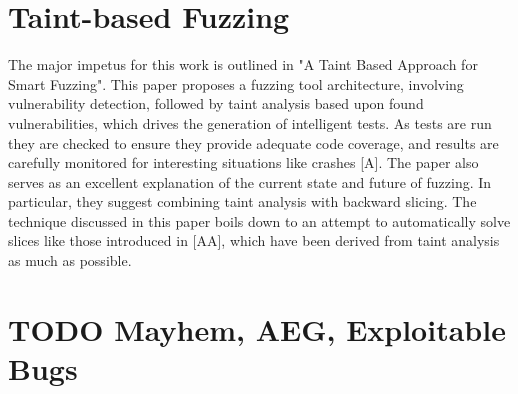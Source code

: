 \documentclass[11pt,expanded,copyright]{fsuthesis}
\begin{document}







\section{Taint-based Fuzzing}

The major impetus for this work is outlined in "A Taint Based Approach for Smart Fuzzing". This paper proposes a fuzzing tool architecture, involving vulnerability detection, followed by taint analysis based upon found vulnerabilities, which drives the generation of intelligent tests. As tests are run they are checked to ensure they provide adequate code coverage, and results are carefully monitored for interesting situations like crashes [A]. The paper also serves as an excellent explanation of the current state and future of fuzzing. In particular, they suggest combining taint analysis with backward slicing. The technique discussed in this paper boils down to an attempt to automatically solve slices like those introduced in [AA], which have been derived from taint analysis as much as possible.

\section{TODO Mayhem, AEG, Exploitable Bugs}
\end{document}
